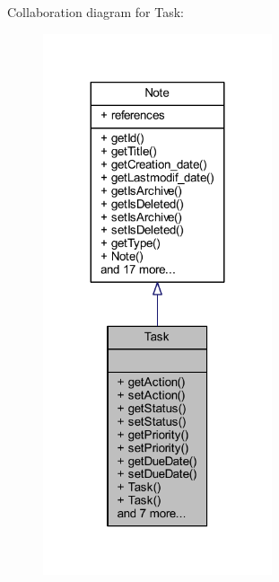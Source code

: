 Collaboration diagram for Task\+:\nopagebreak
\begin{figure}[H]
\begin{center}
\leavevmode
\includegraphics[width=191pt]{class_task__coll__graph}
\end{center}
\end{figure}
